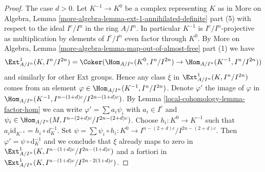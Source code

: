 \begin{proof}
The case $d > 0$. Let $K^{-1} \to K^0$ be a complex representing $K$ as in
More on Algebra, Lemma \ref{more-algebra-lemma-ext-1-annihilated-definite}
part (5) with respect to the ideal $I^c/I^n$ in the ring $A/I^n$.
In particular $K^{-1}$ is $I^c/I^n$-projective as multiplication
by elements of $I^c/I^n$ even factor through $K^0$. By
More on Algebra, Lemma \ref{more-algebra-lemma-map-out-of-almost-free} part (1)
we have
$$
\Ext^1_{A/I^n}(K, I^n/I^{2n}) =
\Coker(\Hom_{A/I^n}(K^0, I^n/I^{2n}) \to \Hom_{A/I^n}(K^{-1}, I^n/I^{2n}))
$$
and similarly for other Ext groups. Hence any class $\xi$ in
$\Ext^1_{A/I^n}(K, I^n/I^{2n})$
comes from an element $\varphi \in \Hom_{A/I^n}(K^{-1}, I^n/I^{2n})$.
Denote $\varphi'$ the image of $\varphi$ in
$\Hom_{A/I^n}(K^{-1}, I^{n - (1 + d)c}/I^{2n - (1 + d)c})$.
By Lemma \ref{local-cohomology-lemma-factor-hom}
we can write $\varphi' = \sum a_i \psi_i$ with $a_i \in I^c$ and
$\psi_i \in \Hom_{A/I^n}(M, I^{n - (2 + d)c}/I^{2n - (2 + d)c})$.
Choose $h_i : K^0 \to K^{-1}$ such that
$a_i \text{id}_{K^{-1}} = h_i \circ d_K^{-1}$. Set
$\psi = \sum \psi_i \circ h_i : K^0 \to I^{n - (2 + d)c}/I^{2n - (2 + d)c}$.
Then $\varphi' = \psi \circ \text{d}_K^{-1}$ and we conclude that
$\xi$ already maps to zero in
$\Ext^1_{A/I^n}(K, I^{n - (1 + d)c}/I^{2n - (1 + d)c})$
and a fortiori in
$\Ext^1_{A/I^n}(K, I^{n - (1 + d)c}/I^{2n - 2(1 + d)c})$.


\end{proof}
